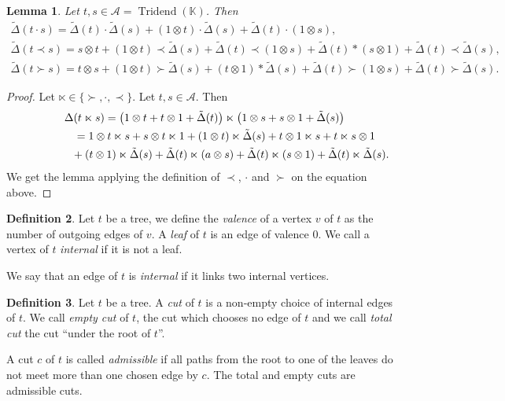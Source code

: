 \documentclass[pdftex]{sigma}
\numberwithin{equation}{section}
\theoremstyle{definition}
\newtheorem{defi}{Definition}[section]
\theoremstyle{plain}
\newtheorem{Lemme}[defi]{Lemma}
\newcommand{\K}{\mathbb{K}}
\DeclareMathOperator{\Tridend}{Tridend}
\begin{document}
 \begin{Lemme}
 	\label{cocalcul}
 	Let $t,s\in \mathcal{A}=\Tridend(\K)$. Then
 	\begin{gather*}
 		\tilde{\Delta}(t\cdot s) =\tilde{\Delta}(t)\cdot \tilde{\Delta}(s)+ (1\otimes t)\cdot \tilde{\Delta}(s)+\tilde{\Delta}(t)\cdot(1\otimes s), \\
 		\tilde{\Delta}(t\prec s) =s\otimes t+ (1\otimes t)\prec \tilde{\Delta}(s)+\tilde{\Delta}(t)\prec (1\otimes s)+\tilde{\Delta}(t)*(s\otimes 1)+\tilde{\Delta}(t)\prec \tilde{\Delta}(s), \\
 		\tilde{\Delta}(t\succ s) =t\otimes s+(1\otimes t)\succ\tilde{\Delta}(s)+(t\otimes 1)*\tilde{\Delta}(s)+\tilde{\Delta}(t)\succ (1\otimes s)+\tilde{\Delta}(t)\succ\tilde{\Delta}(s).
 	\end{gather*}
 \end{Lemme}
\begin{proof}
	Let $\ltimes\in\{ \succ,\cdot,\prec\}$. Let $t,s\in \mathcal{A}$. Then
	\begin{gather*}
		\Delta(t\ltimes s) =\big(1\otimes t+t\otimes 1+\tilde{\Delta}(t)\big)\ltimes \big(1\otimes s+s\otimes 1+\tilde{\Delta}(s)\big) \\
		\hphantom{\Delta(t\ltimes s)}{}=1\otimes t\ltimes s +s\otimes t\ltimes 1+(1\otimes t)\ltimes \tilde{\Delta}(s)+t\otimes 1\ltimes s+ t\ltimes s\otimes 1 \\
		\hphantom{\Delta(t\ltimes s =)}{}+ (t\otimes 1)\ltimes \tilde{\Delta}(s)
		+\tilde{\Delta}(t)\ltimes(a\otimes s)+\tilde{\Delta}(t)\ltimes (s\otimes 1)+\tilde{\Delta}(t)\ltimes \tilde{\Delta}(s).
		\end{gather*}
	We get the lemma applying the definition of $\prec$, $\cdot$ and $\succ$ on the equation above.
	\end{proof}

\begin{defi}
	Let $t$ be a tree, we define the \emph{valence} of a vertex $v$ of $t$ as the number of outgoing edges of $v$.
	A \emph{leaf} of $t$ is an edge of valence $0$. We call a vertex of $t$ \emph{internal} if it is not a leaf.
	
	We say that an edge of $t$ is \emph{internal} if it links two internal vertices.
\end{defi}

\begin{defi}%
	Let $t$ be a tree. A \emph{cut} of $t$ is a non-empty choice of internal edges of $t$. We call \emph{empty cut} of $t$, the cut which chooses no edge of $t$ and we call \emph{total cut} the cut ``under the root of $t$''.

	A cut $c$ of $t$ is called \emph{admissible} if all paths from the root to one of the leaves do not meet more than one chosen edge by $c$. The total and empty cuts are admissible cuts.
\end{defi}
\end{document}
